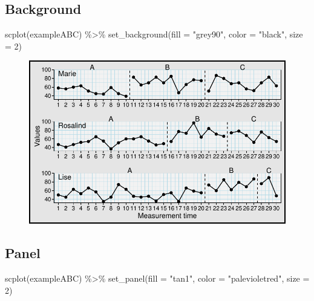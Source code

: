 \documentclass[
  letterpaper,
  DIV=11,
  numbers=noendperiod]{scrreprt}
\newenvironment{Shaded}{\begin{snugshade}}{\end{snugshade}}
\newcommand{\AttributeTok}[1]{\textcolor[rgb]{0.40,0.45,0.13}{#1}}
\newcommand{\DecValTok}[1]{\textcolor[rgb]{0.68,0.00,0.00}{#1}}
\newcommand{\FunctionTok}[1]{\textcolor[rgb]{0.28,0.35,0.67}{#1}}
\newcommand{\NormalTok}[1]{\textcolor[rgb]{0.00,0.23,0.31}{#1}}
\newcommand{\SpecialCharTok}[1]{\textcolor[rgb]{0.37,0.37,0.37}{#1}}
\newcommand{\StringTok}[1]{\textcolor[rgb]{0.13,0.47,0.30}{#1}}
\begin{document}
\hypertarget{background}{%
\subsection{Background}\label{background}}

\begin{Shaded}
\begin{Highlighting}[]
\FunctionTok{scplot}\NormalTok{(exampleABC) }\SpecialCharTok{\%\textgreater{}\%}
  \FunctionTok{set\_background}\NormalTok{(}\AttributeTok{fill =} \StringTok{"grey90"}\NormalTok{, }\AttributeTok{color =} \StringTok{"black"}\NormalTok{, }\AttributeTok{size =} \DecValTok{2}\NormalTok{)}
\end{Highlighting}
\end{Shaded}

\begin{figure}[H]

{\centering \includegraphics{./ch_scplot_files/figure-pdf/background1-1.pdf}

}

\end{figure}

\hypertarget{panel}{%
\subsection{Panel}\label{panel}}

\begin{Shaded}
\begin{Highlighting}[]
\FunctionTok{scplot}\NormalTok{(exampleABC) }\SpecialCharTok{\%\textgreater{}\%}
  \FunctionTok{set\_panel}\NormalTok{(}\AttributeTok{fill =} \StringTok{"tan1"}\NormalTok{, }\AttributeTok{color =} \StringTok{"palevioletred"}\NormalTok{, }\AttributeTok{size =} \DecValTok{2}\NormalTok{)}
\end{Highlighting}
\end{Shaded}
\end{document}
